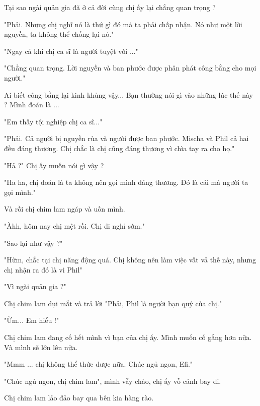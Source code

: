 Tại sao ngài quản gia đã ở cả đời cùng chị ấy lại chẳng quan trọng ?
 
 "Phải. Nhưng chị nghĩ nó là thứ gì đó mà ta phải chấp nhận. Nó như một lời nguyền, ta không thể chống lại nó."
 
 "Ngay cả khi chị ca sĩ là người tuyệt vời ..."
 
 "Chẳng quan trọng. Lời nguyền và ban phước được phân phát công bằng cho mọi người."
 
 Ai biết công bằng lại kinh khủng vậy... Bạn thường nói gì vào những lúc thế này ? Mình đoán là ... 
 
 "Em thấy tội nghiệp chị ca sĩ..."
 
 "Phải. Cả người bị nguyền rủa và người được ban phước. Mischa và Phil cả hai đều đáng thương. Chị chắc là chị cũng đáng thương vì chìa tay ra cho họ."
 
 "Hả ?" Chị ấy muốn nói gì vậy ?
 
 "Ha ha, chị đoán là ta không nên gọi mình đáng thương. Đó là cái mà người ta gọi mình."
 
 Và rồi chị chim lam ngáp và uốn mình.

 "Àhh, hôm nay chị mệt rồi. Chị đi nghỉ sớm."
 
 "Sao lại như vậy ?"
 
 "Hừm, chắc tại chị năng động quá. Chị không nên làm việc vất vả thế này, nhưng chị nhận ra đó là vì Phil"
 
 "Vì ngài quản gia ?"
 
 Chị chim lam dụi mắt và trả lời "Phải, Phil là người bạn quý của chị." 
 
 "Ừm... Em hiểu !"
 
 Chị chim lam đang cố hết mình vì bạn của chị ấy. Mình muốn cố gắng hơn nữa. Và mình sẽ lớn lên nữa.
 
 "Mmm ... chị không thể thức được nữa. Chúc ngủ ngon, Efi."
 
 "Chúc ngủ ngon, chị chim lam", mình vẫy chào, chị ấy vỗ cánh bay đi.
 
 Chị chim lam lảo đảo bay qua bên kia hàng rào. \\
 
 